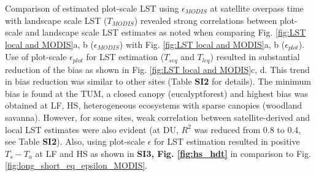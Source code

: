\documentclass[fleqn,10pt]{wlscirep}
\begin{document}
Comparison of estimated plot-scale LST using $\epsilon_{MODIS}$ at satellite overpass time with landscape scale LST ($T_{MODIS}$) revealed strong correlations between plot-scale and landscape scale LST estimates as noted when comparing Fig. \ref{fig:LST local and MODIS}a, b ($\epsilon_{MODIS}$) with Fig. \ref{fig:LST local and MODIS}a, b ($\epsilon_{plot}$). Use  of plot-scale $\epsilon_{plot}$ for LST estimation ($T_{seq}$ and $T_{leq}$) resulted in substantial reduction of the bias as shown in Fig. \ref{fig:LST local and MODIS}c, d. This trend in bias reduction was similar to other sites (Table \textbf{SI2} for details). The  minimum bias is found  at the TUM, a closed canopy (eucalyptforest) and highest bias was obtained at LF, HS, heterogeneous ecosystems with sparse canopies (woodland savanna). However, for some sites, weak correlation between satellite-derived and local LST estimates were also evident (at DU, $R^2$ was reduced from 0.8 to 0.4, see Table \textbf{SI2}). Also, using plot-scale $\epsilon$ for LST estimation resulted in positive $T_{s} - T_{a}$ at LF and HS as shown in \textbf{SI3, Fig. \ref{fig:hs_hdt}} in comparison to Fig. \ref{fig:long_short_eq_epsilon_MODIS}.  
\end{document}
